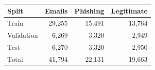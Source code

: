 \begin{tabular}{lrrr}
\toprule
Split & Emails & Phishing & Legitimate\\
\midrule
Train & 29,255 & 15,491 & 13,764\\
Validation & 6,269 & 3,320 & 2,949\\
Test & 6,270 & 3,320 & 2,950\\
\midrule
Total & 41,794 & 22,131 & 19,663\\
\bottomrule
\end{tabular}
